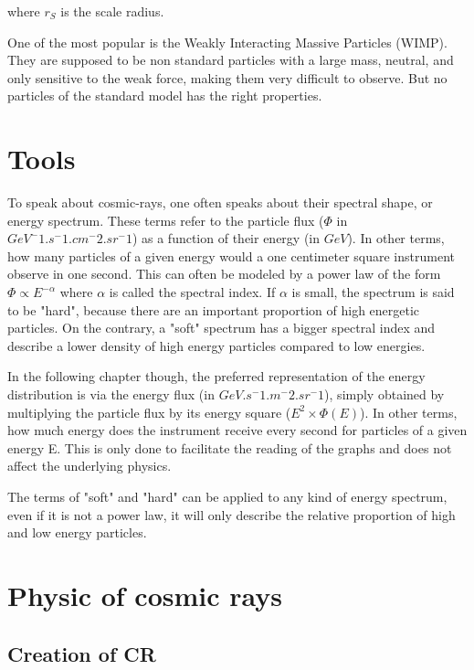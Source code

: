 where $r_S$ is the scale radius.

One of the most popular is the Weakly Interacting Massive Particles (WIMP). They are supposed to be non standard particles with a large mass, neutral, and only sensitive to the weak force, making them very difficult to observe. But no particles of the standard model has the right properties. 


\section{Tools}

To speak about cosmic-rays, one often speaks about their spectral shape, or energy spectrum. These terms refer to the particle flux ($\Phi$ in $GeV^-1.s^-1.cm^-2.sr^-1$) as a function of their energy (in $GeV$).  In other terms, how many particles of a given energy would a one centimeter square instrument observe in one second. This can often be modeled by a power law of the form $\Phi \propto E^{-\alpha}$  where $\alpha$ is called the spectral index. If $\alpha$ is small, the spectrum is said to be "hard", because there are an important proportion of high energetic particles. On the contrary, a "soft" spectrum has a bigger spectral index and describe a lower density of high energy particles compared to low energies.

In the following chapter though, the preferred representation of the energy distribution is via the energy flux (in $GeV.s^-1.m^-2.sr^-1$), simply obtained by multiplying the particle flux by its energy square ($E^2 \times \Phi(E)$). In other terms, how much energy does the instrument receive every second for particles of a given energy E. This is only done to facilitate the reading of the graphs and does not affect the underlying physics.

The terms of "soft" and "hard" can be applied to any kind of energy spectrum, even if it is not a power law, it will only describe the relative proportion of high and low energy particles.



\section{Physic of cosmic rays}

\subsection{Creation of CR}
\label{sec:creation_of_CRs}

